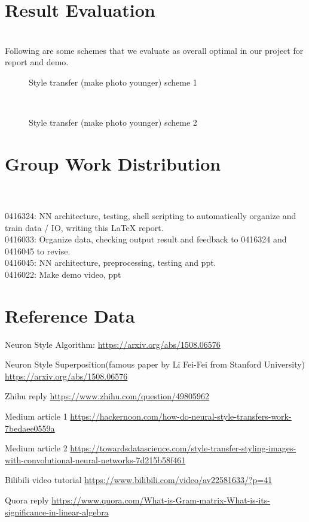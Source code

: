 \documentclass[11pt, a4paper]{article} %
\begin{document}
\section{Result Evaluation}
\\ Following are some schemes that we evaluate as overall optimal in our project for report and demo.
\begin{figure}[H]
    \centering
    \hfill
    \hfill
    \hfill
    \caption{Style transfer (make photo younger) scheme 1}
\end{figure}
\\
\begin{figure}[H]
    \centering
    \hfill
    \hfill
    \hfill
    \caption{Style transfer (make photo younger) scheme 2}
\end{figure}
\section{Group Work Distribution}

\\
\\ 0416324: NN architecture, testing, shell scripting to automatically organize and train data / IO, writing this LaTeX report.
\\ 0416033: Organize data, checking output result and feedback to 0416324 and 0416045 to revise.
\\ 0416045: NN architecture, preprocessing, testing and ppt.
\\ 0416022: Make demo video, ppt
\section{Reference Data}
\item Neuron Style Algorithm: \url{https://arxiv.org/abs/1508.06576}
\item Neuron Style Superposition(famous paper by Li Fei-Fei from Stanford University) \url{https://arxiv.org/abs/1508.06576}
\item Zhihu reply \url{https://www.zhihu.com/question/49805962}
\item Medium article 1 \url{https://hackernoon.com/how-do-neural-style-transfers-work-7bedaee0559a}
\item Medium article 2 \url{https://towardsdatascience.com/style-transfer-styling-images-with-convolutional-neural-networks-7d215b58f461}
\item Bilibili video tutorial \url{https://www.bilibili.com/video/av22581633/?p=41}
\item Quora reply \url{https://www.quora.com/What-is-Gram-matrix-What-is-its-significance-in-linear-algebra}
\end{document}
